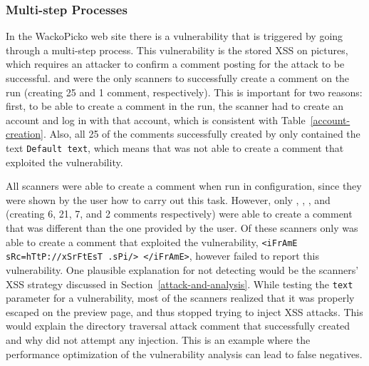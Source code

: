 
\subsubsection{Multi-step Processes}
\label{picture-commenting}

In the WackoPicko web site there is a vulnerability that is triggered
by going through a multi-step process. This vulnerability is
the stored XSS on pictures, which requires an attacker to 
confirm a comment posting for the attack to be successful. 
\hailstorm{} and \ntospider{} were the only scanners to successfully create a comment on the
\initial{} run (creating 25 and 1 comment, respectively). This is
important for two reasons: first, to be able to create a comment 
in the \initial{} run, the scanner had to  create an account
and log in with that account,
which is consistent with Table~\ref{account-creation}. Also,
all 25 of the comments successfully created by \hailstorm{} only
contained the text {\tt Default text}, which means that \hailstorm{} was not
able to create a comment that exploited the vulnerability. 

All scanners were able to
create a comment when run in \manual{} configuration, since they were shown by 
the user how to carry out this task. However, only \appscan, \hailstorm, \ntospider{},
and \webinspect{} (creating 6, 21, 7, and 2 comments respectively)
were able to create a comment that was different 
than the one provided by the user. Of these scanners only
\webinspect{} was able to create a comment that exploited the
vulnerability, 
{\tt <iFrAmE sRc=hTtP://xSrFtEsT .sPi/> </iFrAmE>}, however \webinspect{} failed
to report this vulnerability. One plausible explanation for not detecting
would be the scanners' XSS strategy discussed in
Section~\ref{attack-and-analysis}. While testing the {\tt text} parameter for
a vulnerability, most of the scanners realized that it was properly
escaped on the preview page, and thus stopped trying to inject XSS attacks.
This would explain the directory traversal attack comment that \appscan{}
successfully created and why \hailstorm{} did not attempt any injection. This is
an example where the performance optimization of the vulnerability analysis can
lead to false negatives.

